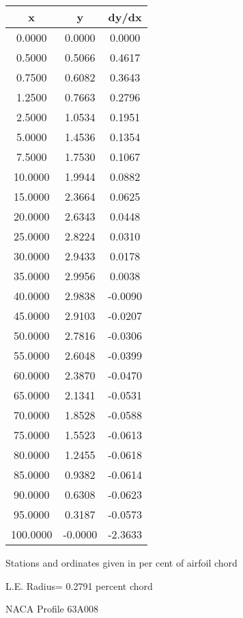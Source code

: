 \documentclass[11pt]{book}
\begin{document}
 \vspace{8mm}
 \begin{tabular}{|c|c|c|} \hline 
  x  &  y  &  dy/dx \\
 \hline
0.0000 & 0.0000 & 0.0000 \\
0.5000 & 0.5066 & 0.4617 \\
0.7500 & 0.6082 & 0.3643 \\
1.2500 & 0.7663 & 0.2796 \\
2.5000 & 1.0534 & 0.1951 \\
5.0000 & 1.4536 & 0.1354 \\
7.5000 & 1.7530 & 0.1067 \\
10.0000 & 1.9944 & 0.0882 \\
15.0000 & 2.3664 & 0.0625 \\
20.0000 & 2.6343 & 0.0448 \\
25.0000 & 2.8224 & 0.0310 \\
30.0000 & 2.9433 & 0.0178 \\
35.0000 & 2.9956 & 0.0038 \\
40.0000 & 2.9838 & -0.0090 \\
45.0000 & 2.9103 & -0.0207 \\
50.0000 & 2.7816 & -0.0306 \\
55.0000 & 2.6048 & -0.0399 \\
60.0000 & 2.3870 & -0.0470 \\
65.0000 & 2.1341 & -0.0531 \\
70.0000 & 1.8528 & -0.0588 \\
75.0000 & 1.5523 & -0.0613 \\
80.0000 & 1.2455 & -0.0618 \\
85.0000 & 0.9382 & -0.0614 \\
90.0000 & 0.6308 & -0.0623 \\
95.0000 & 0.3187 & -0.0573 \\
100.0000 & -0.0000 & -2.3633 \\
 \hline
 \end{tabular}
 \vspace{8mm}


Stations and ordinates given in per cent of airfoil chord 


L.E. Radius=  0.2791 percent chord
 \newpage
  \label{p63A008}
 \begin{Large}
 NACA Profile 63A008
 \end{Large}
  
\end{document}
